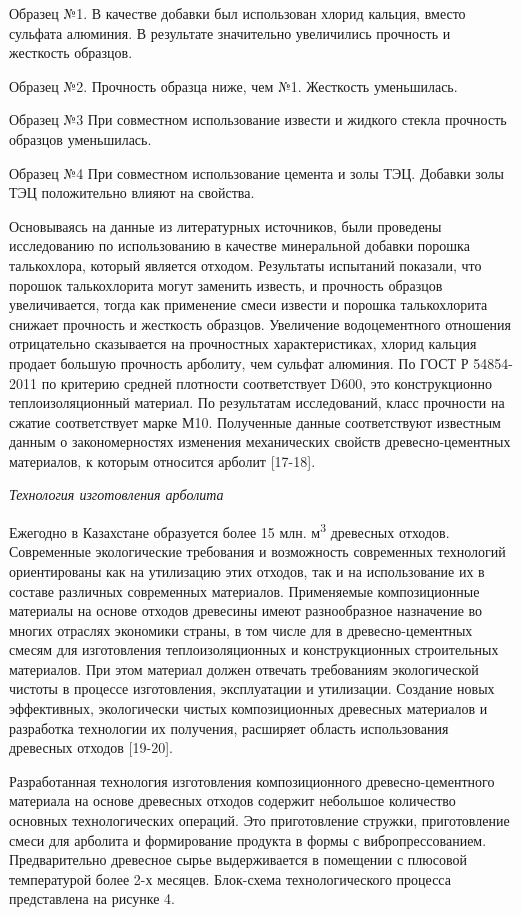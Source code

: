 Образец №1. В качестве добавки был использован хлорид кальция, вместо
сульфата алюминия. В результате значительно увеличились прочность и
жесткость образцов.

Образец №2. Прочность образца ниже, чем №1. Жесткость уменьшилась.

Образец №3 При совместном использование извести и жидкого стекла
прочность образцов уменьшилась.

Образец №4 При совместном использование цемента и золы ТЭЦ. Добавки золы
ТЭЦ положительно влияют на свойства.

Основываясь на данные из литературных источников, были проведены
исследованию по использованию в качестве минеральной добавки порошка
талькохлора, который является отходом. Результаты испытаний показали,
что порошок талькохлорита могут заменить известь, и прочность образцов
увеличивается, тогда как применение смеси извести и порошка
талькохлорита снижает прочность и жесткость образцов. Увеличение
водоцементного отношения отрицательно сказывается на прочностных
характеристиках, хлорид кальция продает большую прочность арболиту, чем
сульфат алюминия. По ГОСТ Р 54854-2011 по критерию средней плотности
соответствует D600, это конструкционно теплоизоляционный материал. По
результатам исследований, класс прочности на сжатие соответствует марке
М10. Полученные данные соответствуют известным данным о закономерностях
изменения механических свойств древесно-цементных материалов, к которым
относится арболит {[}17-18{]}.

\emph{Технология изготовления арболита}

Ежегодно в Казахстане образуется более 15 млн. м\textsuperscript{3}
древесных отходов. Современные экологические требования и возможность
современных технологий ориентированы как на утилизацию этих отходов, так
и на использование их в составе различных современных материалов.
Применяемые композиционные материалы на основе отходов древесины имеют
разнообразное назначение во многих отраслях экономики страны, в том
числе для в древесно-цементных смесям для изготовления теплоизоляционных
и конструкционных строительных материалов. При этом материал должен
отвечать требованиям экологической чистоты в процессе изготовления,
эксплуатации и утилизации. Создание новых эффективных, экологически
чистых композиционных древесных материалов и разработка технологии их
получения, расширяет область использования древесных отходов
{[}19-20{]}.

Разработанная технология изготовления композиционного
древесно-цементного материала на основе древесных отходов содержит
небольшое количество основных технологических операций. Это
приготовление стружки, приготовление смеси для арболита и формирование
продукта в формы с вибропрессованием. Предварительно древесное сырье
выдерживается в помещении с плюсовой температурой более 2-х месяцев.
Блок-схема технологического процесса представлена на рисунке 4.


